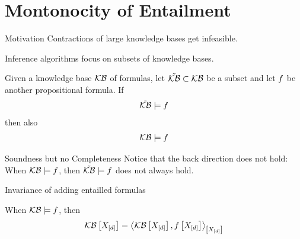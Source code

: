 \documentclass{beamer}
\begin{document}
    {\frame[plain]{\titlepage}}

    \showoutlineatsection


    \section{Montonocity of Entailment}

    \begin{frame}{Motivation}
        Contractions of large knowledge bases get infeasible.

        Inference algorithms focus on subsets of knowledge bases.

    \end{frame}

    \begin{frame}{}

        \begin{theorem}
            Given a knowledge base $\mathcal{KB}$ of formulas, let $\tilde{\mathcal{KB}}\subset\mathcal{KB}$ be a subset and let $f$ be another propositional formula.
            If
            \begin{align*}
                \tilde{\mathcal{KB}}\models f
            \end{align*}
            then also
            \begin{align*}
                \mathcal{KB}\models f
            \end{align*}
        \end{theorem}

    \end{frame}


    \begin{frame}{Soundness but no Completeness}
        Notice that the back direction does not hold:
        When $\mathcal{KB}\models f$, then $\tilde{\mathcal{KB}}\models f$ does not always hold.


    \end{frame}

    \begin{frame}{Invariance of adding entailled formulas}

        When $\mathcal{KB}\models f$, then
        \begin{align*}
            \mathcal{KB}\left[X_{[d]}\right]
            = \left\langle \mathcal{KB}\left[X_{[d]}\right],f\left[X_{[d]}\right]\right\rangle_{\left[ X_{[d]} \right]}
        \end{align*}

        \begin{block}{}
        \end{block}

    \end{frame}
\end{document}
